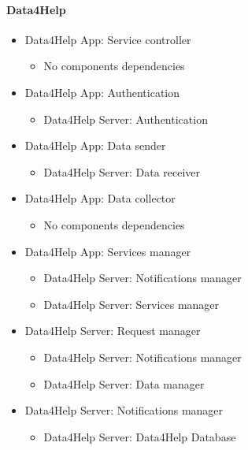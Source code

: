 		\paragraph{Data4Help}
		\begin{itemize}

			\item{Data4Help App: Service controller}
			\begin{itemize}\item{No components dependencies}\end{itemize}

			\item{Data4Help App: Authentication}
			\begin{itemize}\item{Data4Help Server: Authentication}\end{itemize}

			\item{Data4Help App: Data sender}
			\begin{itemize}\item{Data4Help Server: Data receiver}\end{itemize}

			\item{Data4Help App: Data collector}
			\begin{itemize}\item{No components dependencies}\end{itemize}

			\item{Data4Help App: Services manager}
			\begin{itemize}\item{Data4Help Server: Notifications manager}\item{Data4Help Server: Services manager}\end{itemize}

			\item{Data4Help Server: Request manager}
			\begin{itemize}\item{Data4Help Server: Notifications manager}\item{Data4Help Server: Data manager}\end{itemize}

			\item{Data4Help Server: Notifications manager}
			\begin{itemize}\item{Data4Help Server: Data4Help Database}\end{itemize}


\end{itemize}

